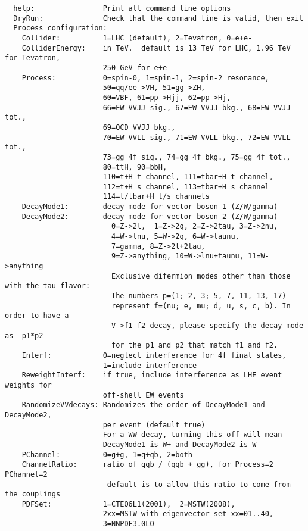 \documentclass[aps,superscriptaddress,nofootinbib]{revtex4}
\begin{document}
\begin{verbatim}
  help:                Print all command line options
  DryRun:              Check that the command line is valid, then exit
  Process configuration:
    Collider:          1=LHC (default), 2=Tevatron, 0=e+e-
    ColliderEnergy:    in TeV.  default is 13 TeV for LHC, 1.96 TeV for Tevatron,
                       250 GeV for e+e-
    Process:           0=spin-0, 1=spin-1, 2=spin-2 resonance,
                       50=qq/ee->VH, 51=gg->ZH,
                       60=VBF, 61=pp->Hjj, 62=pp->Hj,
                       66=EW VVJJ sig., 67=EW VVJJ bkg., 68=EW VVJJ tot.,
                       69=QCD VVJJ bkg.,
                       70=EW VVLL sig., 71=EW VVLL bkg., 72=EW VVLL tot.,
                       73=gg 4f sig., 74=gg 4f bkg., 75=gg 4f tot.,
                       80=ttH, 90=bbH,
                       110=t+H t channel, 111=tbar+H t channel,
                       112=t+H s channel, 113=tbar+H s channel
                       114=t/tbar+H t/s channels
    DecayMode1:        decay mode for vector boson 1 (Z/W/gamma)
    DecayMode2:        decay mode for vector boson 2 (Z/W/gamma)
                         0=Z->2l,  1=Z->2q, 2=Z->2tau, 3=Z->2nu,
                         4=W->lnu, 5=W->2q, 6=W->taunu,
                         7=gamma, 8=Z->2l+2tau,
                         9=Z->anything, 10=W->lnu+taunu, 11=W->anything
                         Exclusive difermion modes other than those with the tau flavor:
                         The numbers p=(1; 2, 3; 5, 7, 11, 13, 17)
                         represent f=(nu; e, mu; d, u, s, c, b). In order to have a
                         V->f1 f2 decay, please specify the decay mode as -p1*p2
                         for the p1 and p2 that match f1 and f2.
    Interf:            0=neglect interference for 4f final states,
                       1=include interference
    ReweightInterf:    if true, include interference as LHE event weights for
                       off-shell EW events
    RandomizeVVdecays: Randomizes the order of DecayMode1 and DecayMode2,
                       per event (default true)
                       For a WW decay, turning this off will mean
                       DecayMode1 is W+ and DecayMode2 is W-
    PChannel:          0=g+g, 1=q+qb, 2=both
    ChannelRatio:      ratio of qqb / (qqb + gg), for Process=2 PChannel=2
                        default is to allow this ratio to come from the couplings
    PDFSet:            1=CTEQ6L1(2001),  2=MSTW(2008),
                       2xx=MSTW with eigenvector set xx=01..40,
                       3=NNPDF3.0LO

\end{verbatim}
\end{document}
